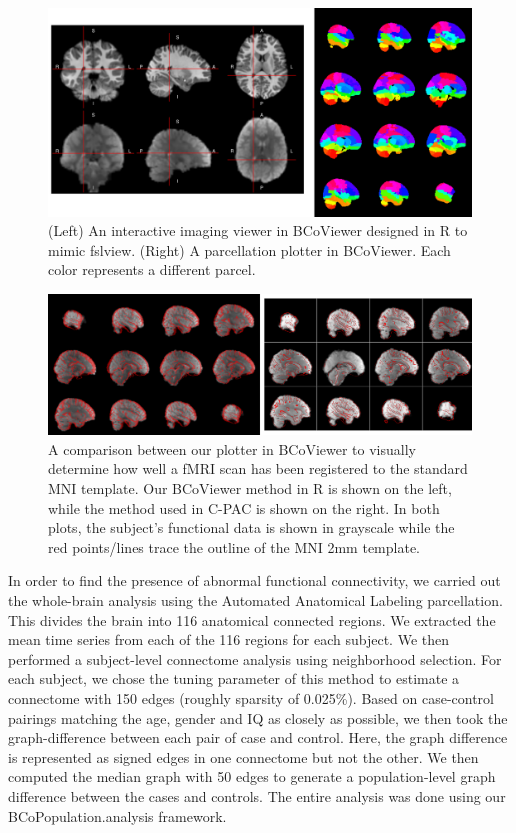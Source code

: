 \documentclass{nature}
\begin{document}
\begin{figure}[tb]
\centering
\includegraphics[width=400pt]{fig/brainconductor/BCoViewer.png}
\caption{(Left) An interactive imaging viewer in BCoViewer designed in R to mimic fslview. (Right) A parcellation plotter in BCoViewer. Each color represents a different parcel.}
\label{fig:features}
\end{figure}

\begin{figure}[tb]
\centering
\includegraphics[width=400pt]{fig/brainconductor/comparison.png}
\caption{A comparison between our plotter in BCoViewer to visually determine how well
a fMRI scan has been registered to the standard MNI template. Our BCoViewer method in R
is shown on the left, while the method used in C-PAC is shown on the right. In 
both plots, the subject's functional data is shown in grayscale while the red points/lines
trace the outline of the MNI 2mm template.}
\label{fig:overlap}
\end{figure}

In order to find the presence of abnormal functional connectivity, we 
carried out the whole-brain analysis using the Automated Anatomical Labeling\cite{tzourio2002automated} parcellation. This divides the brain into
116 anatomical connected regions. We extracted the mean time series from each
of the 116 regions for each subject. We then performed a subject-level connectome
analysis using neighborhood selection\cite{meinshausen2006high}. For
each subject, we chose the tuning
parameter of this method to estimate a connectome with 150 edges (roughly sparsity
of 0.025\%). 
Based on case-control pairings matching the age, gender and IQ as closely as possible,
we then took the graph-difference between each pair of case and control. Here,
the graph difference is represented as signed edges in one connectome but not the other. 
We then computed the median graph\cite{han2013sparse} with 
50 edges 
to generate a population-level graph difference between the cases and controls.
The entire analysis was done using our BCoPopulation.analysis framework.
\end{document}
